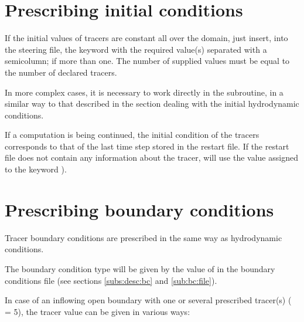 \section{Prescribing initial conditions}

If the initial values of tracers are constant all over the domain, just insert,
into the steering file, the keyword  with the
required value(s) separated with a semicolumn; if more than one.
The number of supplied values must be equal to the number of declared tracers.

In more complex cases, it is necessary to work directly in the
 subroutine, in a similar way to that described
in the section dealing with the initial hydrodynamic conditions.

If a computation is being continued, the initial condition of the tracers
corresponds to that of the last time step stored in the restart file.
If the restart file does not contain any information about the tracer,
 will use the value assigned to the keyword
).

\section{Prescribing boundary conditions}
\label{sec:tr:prescr:bc}
Tracer boundary conditions are prescribed in the same way as hydrodynamic
conditions.

The boundary condition type will be given by the value of 
in the boundary conditions file (see sections \ref{subs:desc:bc} and
\ref{sub:bc:file}).

In case of an inflowing open boundary with one or several prescribed tracer(s)
( = 5), the tracer value can be given in various ways:

